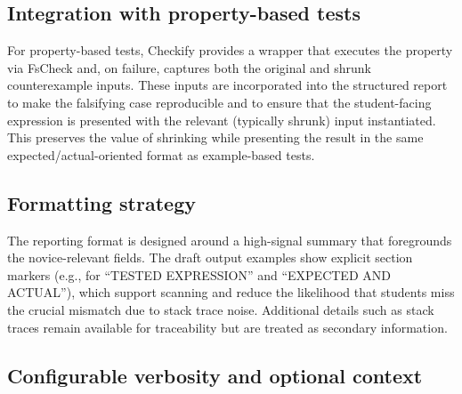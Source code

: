\subsection{Integration with property-based tests} %
     \label{Integration with property-based tests} %


\begin{justify}
For property-based tests, Checkify provides a wrapper that executes the property via FsCheck and,
on failure, captures both the original and shrunk counterexample inputs. These inputs are
incorporated into the structured report to make the falsifying case reproducible and to ensure that
the student-facing expression is presented with the relevant (typically shrunk) input instantiated.
This preserves the value of shrinking while presenting the result in the same
expected/actual-oriented format as example-based tests.
\end{justify}


\subsection{Formatting strategy} %
     \label{Formatting strategy} %


\begin{justify}
The reporting format is designed around a high-signal summary that foregrounds the novice-relevant
fields. The draft output examples show explicit section markers (e.g., for ``TESTED EXPRESSION'' and
``EXPECTED AND ACTUAL''), which support scanning and reduce the likelihood that students miss the
crucial mismatch due to stack trace noise. Additional details such as stack traces remain available
for traceability but are treated as secondary information.
\end{justify}


\subsection{Configurable verbosity and optional context} %
     \label{Configurable verbosity and optional context} %


